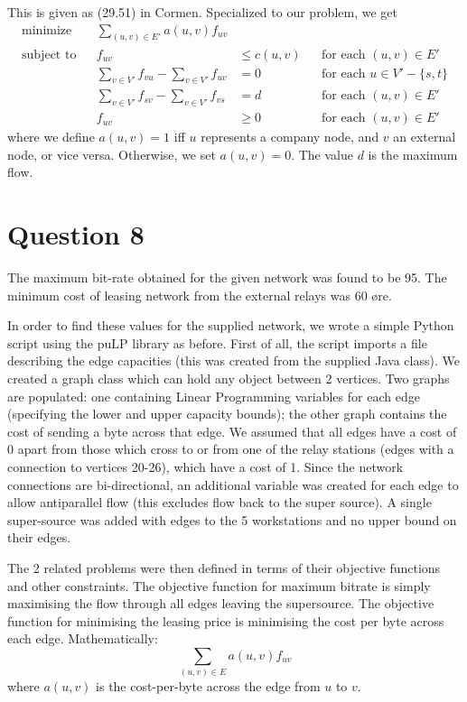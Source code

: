 \documentclass[a4paper, 10pt, oneside, article]{memoir}
\begin{document}
This is given as (29.51) in Cormen. Specialized to our problem, we get
\begin{align*}
\text{minimize} && \sum_{(u,v) \in E'} a(u,v) f_{uv} \\
\text{subject to} && f_{uv} &\leq c(u,v) && \text{for each $(u,v) \in E'$} \\
                  && \sum_{v \in V'} f_{vu} - \sum_{v \in V'} f_{uv} &= 0 && \text{for each $u \in V' - \{s, t \}$} \\
                  && \sum_{v \in V'} f_{sv} - \sum_{v \in V'} f_{vs} &= d && \text{for each $(u,v) \in E'$} \\
                  && f_{uv} &\geq 0 && \text{for each $(u,v) \in E'$}
\end{align*}
where we define $a(u,v) = 1$ iff $u$ represents a company node, and
$v$ an external node, or vice versa. Otherwise, we set $a(u,v) =
0$. The value $d$ is the maximum flow.

\section*{Question 8}
The maximum bit-rate obtained for the given network was found to be
95. The minimum cost of leasing network from the external relays was
60 øre.

In order to find these values for the supplied network, we wrote a
simple Python script using the puLP library as before.  First of all,
the script imports a file describing the edge capacities (this was
created from the supplied Java class). We created a graph class which
can hold any object between 2 vertices. Two graphs are populated: one
containing Linear Programming variables for each edge (specifying the
lower and upper capacity bounds); the other graph contains the cost of
sending a byte across that edge. We assumed that all edges have a cost
of 0 apart from those which cross to or from one of the relay stations
(edges with a connection to vertices 20-26), which have a cost of 1.
Since the network connections are bi-directional, an additional
variable was created for each edge to allow antiparallel flow (this
excludes flow back to the super source). A single super-source was
added with edges to the 5 workstations and no upper bound on their
edges.

The 2 related problems were then defined in terms of their objective
functions and other constraints. The objective function for maximum
bitrate is simply maximising the flow through all edges leaving the
supersource. The objective function for minimising the leasing price
is minimising the cost per byte across each edge. Mathematically:
\begin{equation*}
\sum_{(u,v) \in E} a(u,v) f_{uv}
\end{equation*}
where $a(u,v)$ is the cost-per-byte across the edge from $u$ to $v$.
\end{document}
